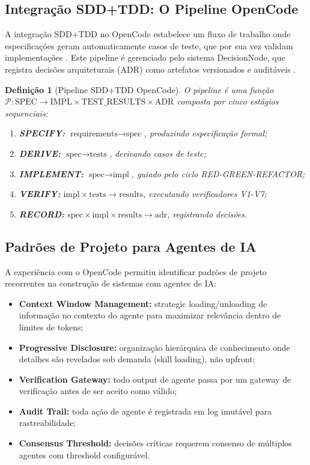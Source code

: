 \documentclass[12pt,a4paper,sumario=tradicional]{abntex2}
\newtheorem{definition}{Definição}[chapter]
\begin{document}
\subsection{Integração SDD+TDD: O Pipeline OpenCode}

A integração SDD+TDD no OpenCode estabelece um fluxo de trabalho onde especificações geram automaticamente casos de teste, que por sua vez validam implementações \cite{gomes2025sdscai}. Este pipeline é gerenciado pelo sistema DecisionNode, que registra decisões arquiteturais (ADR) como artefatos versionados e auditáveis \cite{kruchten2009documentation}.

\begin{definition}[Pipeline SDD+TDD OpenCode]
O pipeline é uma função $\mathcal{P}: \text{SPEC} \rightarrow \text{IMPL} \times \text{TEST\_RESULTS} \times \text{ADR}$ composta por cinco estágios sequenciais:
\begin{enumerate}
    \item \textbf{SPECIFY:} $\text{requirements} \rightarrow \text{spec}$, produzindo especificação formal;
    \item \textbf{DERIVE:} $\text{spec} \rightarrow \text{tests}$, derivando casos de teste;
    \item \textbf{IMPLEMENT:} $\text{spec} \rightarrow \text{impl}$, guiado pelo ciclo RED-GREEN-REFACTOR;
    \item \textbf{VERIFY:} $\text{impl} \times \text{tests} \rightarrow \text{results}$, executando verificadores V1-V7;
    \item \textbf{RECORD:} $\text{spec} \times \text{impl} \times \text{results} \rightarrow \text{adr}$, registrando decisões.
\end{enumerate}
\end{definition}

\subsection{Padrões de Projeto para Agentes de IA}

A experiência com o OpenCode permitiu identificar padrões de projeto recorrentes na construção de sistemas com agentes de IA:

\begin{itemize}
    \item \textbf{Context Window Management:} strategic loading/unloading de informação no contexto do agente para maximizar relevância dentro de limites de tokens;
    \item \textbf{Progressive Disclosure:} organização hierárquica de conhecimento onde detalhes são revelados sob demanda (skill loading), não upfront;
    \item \textbf{Verification Gateway:} todo output de agente passa por um gateway de verificação antes de ser aceito como válido;
    \item \textbf{Audit Trail:} toda ação de agente é registrada em log imutável para rastreabilidade;
    \item \textbf{Consensus Threshold:} decisões críticas requerem consenso de múltiplos agentes com threshold configurável.
\end{itemize}
\end{document}
